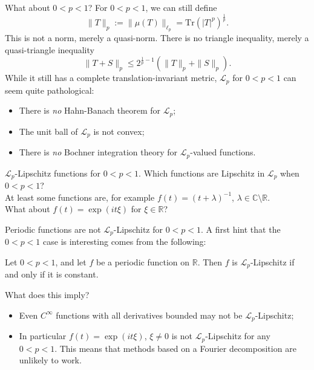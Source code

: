 \documentclass{beamer}
\numberwithin{equation}{section}
\theoremstyle{plain}
\theoremstyle{plain}
\theoremstyle{definition}
\theoremstyle{plain}
\theoremstyle{plain}
\theoremstyle{definition}
\newcommand{\Rl}{\mathbb{R}}
\newcommand{\Cplx}{\mathbb{C}}
\newcommand{\Lc}{\mathcal{L}}
\newcommand{\Tr}{\mathrm{Tr}}
\begin{document}
\begin{frame}{What about $0 < p < 1$?}
    For $0 < p < 1$, we can still define
    $$
        \|T\|_p := \|\mu(T)\|_{\ell_p} = \Tr(|T|^p)^{\frac1p}.
    $$
    This is not a norm, merely a quasi-norm. There is no triangle inequality, merely a quasi-triangle inequality
    $$
        \|T+S\|_p \leq 2^{\frac1p-1}(\|T\|_p+\|S\|_p).
    $$
    \pause
    While it still has a complete translation-invariant metric, $\Lc_p$ for $0 < p < 1$ can seem quite pathological:\pause
    \begin{itemize}
        \item{} There is \emph{no} Hahn-Banach theorem for $\Lc_p$;\pause
        \item{} The unit ball of $\Lc_p$ is not convex;\pause
        \item{} There is \emph{no} Bochner integration theory for $\Lc_p$-valued functions.
    \end{itemize}
\end{frame}

\begin{frame}{$\Lc_p$-Lipschitz functions for $0 < p < 1.$}
    Which functions are Lipschitz in $\Lc_p$ when $0 < p < 1$? \\
    \pause
    At least some functions are, for example $f(t) = (t+\lambda)^{-1}$, $\lambda \in \Cplx\setminus \Rl.$\\
    \pause
    What about $f(t) = \exp(it\xi)$ for $\xi\in \Rl$?
\end{frame} 

\begin{frame}{Periodic functions are not $\Lc_p$-Lipschitz for $0 < p < 1$.}
    A first hint that the $0 < p < 1$ case is interesting comes from the following:
    \begin{lemma}
        Let $0 < p < 1$, and let $f$ be a periodic function on $\Rl$. Then $f$ is $\Lc_p$-Lipschitz
        if and only if it is constant.
    \end{lemma}
    What does this imply?\pause
    \begin{itemize}
        \item{} Even $C^\infty$ functions with all derivatives bounded may not be $\Lc_p$-Lipschitz;\\
        \item{} In particular $f(t) = \exp(it\xi)$, $\xi\neq 0$ is not $\Lc_p$-Lipschitz for any $0 < p < 1.$ This means that methods based on a Fourier decomposition
        are unlikely to work.
    \end{itemize}
\end{frame}
\end{document}
